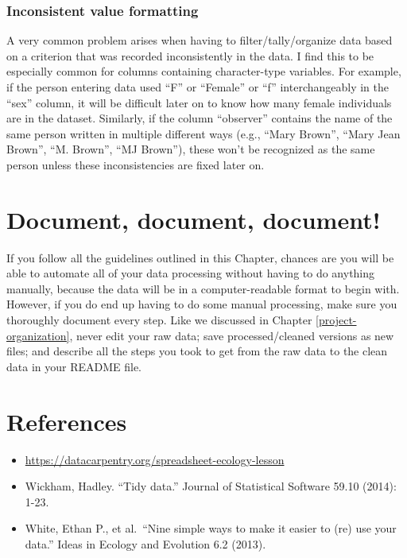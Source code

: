 \documentclass[
]{book}
\providecommand{\tightlist}{%
  \setlength{\itemsep}{0pt}\setlength{\parskip}{0pt}}
\begin{document}
\hypertarget{inconsistent-value-formatting}{%
\subsubsection{Inconsistent value formatting}\label{inconsistent-value-formatting}}

A very common problem arises when having to filter/tally/organize data based on a criterion that was recorded inconsistently in the data. I find this to be especially common for columns containing character-type variables. For example, if the person entering data used ``F'' or ``Female'' or ``f'' interchangeably in the ``sex'' column, it will be difficult later on to know how many female individuals are in the dataset. Similarly, if the column ``observer'' contains the name of the same person written in multiple different ways (e.g., ``Mary Brown'', ``Mary Jean Brown'', ``M. Brown'', ``MJ Brown''), these won't be recognized as the same person unless these inconsistencies are fixed later on.

\hypertarget{document-document-document}{%
\section{Document, document, document!}\label{document-document-document}}

If you follow all the guidelines outlined in this Chapter, chances are you will be able to automate all of your data processing without having to do anything manually, because the data will be in a computer-readable format to begin with. However, if you do end up having to do some manual processing, make sure you thoroughly document every step. Like we discussed in Chapter \ref{project-organization}, never edit your raw data; save processed/cleaned versions as new files; and describe all the steps you took to get from the raw data to the clean data in your README file.

\hypertarget{references-3}{%
\section{References}\label{references-3}}

\begin{itemize}
\tightlist
\item
  \url{https://datacarpentry.org/spreadsheet-ecology-lesson}
\item
  Wickham, Hadley. ``Tidy data.'' Journal of Statistical Software 59.10 (2014): 1-23.
\item
  White, Ethan P., et al.~``Nine simple ways to make it easier to (re) use your data.'' Ideas in Ecology and Evolution 6.2 (2013).
\end{itemize}
\end{document}
